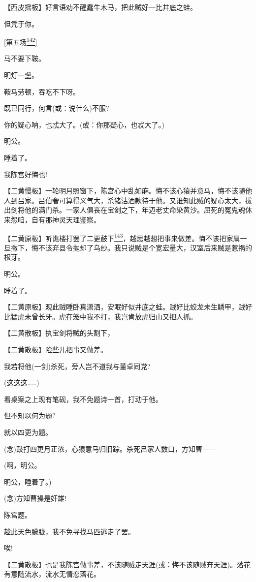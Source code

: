 【西皮摇板】好言语劝不醒蠢牛木马，把此贼好一比井底之蛙。

但凭于你。

{[}第五场\protect\hyperlink{fn142}{\textsuperscript{142}}{]}

马不要下鞍。

明灯一盏。

鞍马劳顿，吞吃不下呀。

既已同行，何言(或：说什么)不服?

你的疑心呐，也忒大了。(或：你那疑心，也忒大了。)

明公。

睡着了。

我陈宫好悔也!

【二黄慢板】一轮明月照窗下，陈宫心中乱如麻。悔不该心猿并意马，悔不该随他人到吕家。吕伯奢可算得义气大，杀猪沽酒款待于他。又谁知此贼的疑心太大，拔出剑将他的满门杀。一家人俱丧在宝剑之下，年迈老丈命染黄沙。屈死的冤鬼魂休来怨咱，自有那神灵天理鉴察。

【二黄原板】听谯楼打罢了二更鼓下\protect\hyperlink{fn143}{\textsuperscript{143}}，越思越想把事来做差。悔不该把家属一旦撇下，悔不该弃县令抛却了乌纱。我只说贼是个宽宏量大，汉室后来贼是惹祸的根芽。

明公。

睡着了。

【二黄原板】观此贼睡卧真潇洒，安眠好似井底之蛙。贼好比蛟龙未生鳞甲，贼好比猛虎未曾长牙。虎在笼中我不打，我岂肯放虎归山又把人抓。

【二黄散板】执宝剑将贼的头割下，

【二黄散板】险些儿把事又做差。

我若将他(一剑)杀死，旁人岂不道我与董卓同党?

(这这这\ldots{}\ldots{})

看桌案之上现有笔砚，我不免题诗一首，打动于他。

但不知以何为题?

就以四更为题。

(念)鼓打四更月正浓，心猿意马归旧踪。杀死吕家人数口，方知曹------

(啊，明公。

明公，睡着了。)

(念)方知曹操是奸雄!

陈宫题。

趁此天色朦胧，我不免寻找马匹逃走了罢。

唉!

【二黄散板】也是我陈宫做事差，不该随贼走天涯(或：悔不该随贼奔天涯)。落花有意随流水，流水无情恋落花。

